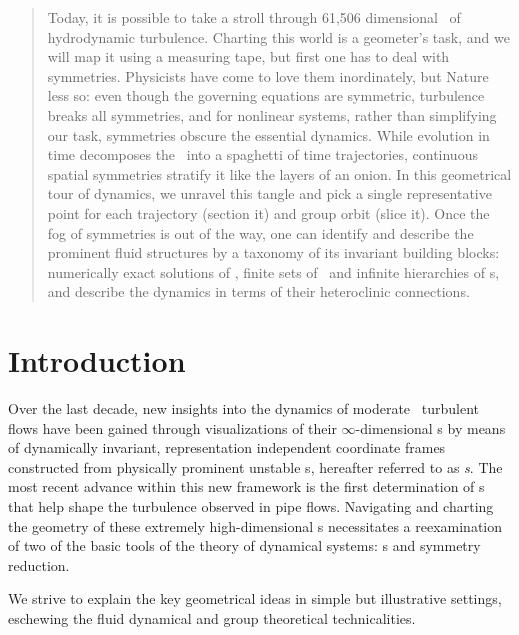 \documentclass[aip,cha,reprint,
secnumarabic,
nofootinbib, tightenlines,
nobibnotes, showkeys, showpacs,
groupedaddress
]{revtex4-1}
\begin{document}
    \begin{quotation}
Today, it is possible to take a stroll through 61,506 dimensional
\statesp\ of hydrodynamic turbulence. Charting this world is a geometer's
task, and we will map it using a measuring tape, but first one has to
deal with symmetries. Physicists have come to love them inordinately, but
Nature less so: even though the governing equations are symmetric,
turbulence breaks all symmetries, and for nonlinear systems, rather than
simplifying our task, symmetries obscure the essential dynamics. While
evolution in time decomposes the \statesp\ into a spaghetti of time
trajectories, continuous spatial symmetries stratify it like the layers
of an onion. In this geometrical tour of dynamics, we unravel this tangle
and pick a single representative point for each trajectory (section it)
and  group orbit (slice it). Once the fog of symmetries is out of the
way, one can identify and describe the prominent fluid structures by a
taxonomy of its invariant building blocks: numerically exact solutions of
\NSe, finite sets of \reqva\ and infinite hierarchies of \rpo s, and
describe the dynamics in terms of their heteroclinic connections.
    \end{quotation}

\section{Introduction}
\label{s:intro}

Over the last decade, new insights into the dynamics of moderate
\Reynolds\ turbulent flows have been gained through visualizations of
their $\infty$-dimensional \statesp s by means of dynamically invariant,
representation independent coordinate frames constructed from
physically prominent unstable {\cohStr s}, hereafter referred to as {\em
\template s}.
The most recent advance within this new framework is the first
determination of \rpo s that help shape the turbulence observed in pipe
flows. Navigating and charting the geometry of these
extremely high-dimensional \statesp s necessitates a reexamination of two
of the basic tools of the theory of dynamical systems: \PoincSec s and
symmetry reduction.

We strive to explain the key geometrical ideas in simple but illustrative
settings, eschewing the fluid dynamical and group theoretical
technicalities.
\end{document}
